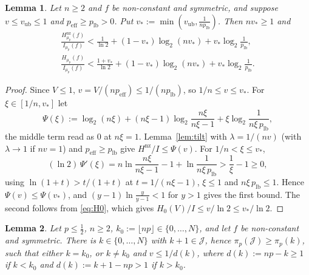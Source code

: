 \documentclass[11pt]{amsart}
\newtheorem{lemma}{Lemma}[section]
\theoremstyle{remark}
\newcommand{\peff}{p_{\mathrm{eff}}}
\newcommand{\J}{\mathcal{J}}
\begin{document}
\begin{lemma}\label{lem:opt}
Let $n \ge 2$ and $f$ be non-constant and symmetric, and suppose $v \le v_{\mathrm{ub}} \le 1$ and $\peff \ge p_{\mathrm{lb}} > 0$. Put $v_* := \min(v_{\mathrm{ub}}, \frac{1}{n p_{\mathrm{lb}}})$. Then $nv_* \ge 1$ and
\[
\begin{gathered}
\frac{H^{\mathrm{nz}}_{\mu_p}(f)}{I_{\mu_p}(f)} < \frac{1}{\ln 2} + (1 - v_*)\log_2(nv_*) + v_*\log_2\frac{1}{p_{\mathrm{lb}}},\\
\frac{H_{\mu_p}(f)}{I_{\mu_p}(f)} < \frac{1 + v_*}{\ln 2} + (1 - v_*)\log_2(nv_*) + v_*\log_2\frac{1}{p_{\mathrm{lb}}}.
\end{gathered}
\]
\end{lemma}

\begin{proof}
Since $V \le 1$, $v = V/(n\peff) \le 1/(n p_{\mathrm{lb}})$, so $1/n \le v \le v_*$. For $\xi \in [1/n, v_*]$ let
\[
\Psi(\xi) := \log_2(n\xi) + (n\xi - 1)\log_2\frac{n\xi}{n\xi - 1} + \xi\log_2\frac{1}{n\xi\,p_{\mathrm{lb}}},
\]
the middle term read as $0$ at $n\xi = 1$. Lemma~\ref{lem:tilt} with $\lambda = 1/(nv)$ (with $\lambda \to 1$ if $nv = 1$) and $\peff \ge p_{\mathrm{lb}}$ give $H^{\mathrm{nz}}/I \le \Psi(v)$. For $1/n < \xi \le v_*$,
\[
(\ln 2)\,\Psi'(\xi) = n\ln\frac{n\xi}{n\xi - 1} - 1 + \ln\frac{1}{n\xi\,p_{\mathrm{lb}}} > \frac1\xi - 1 \ge 0,
\]
using $\ln(1 + t) > t/(1+t)$ at $t = 1/(n\xi - 1)$, $\xi \le 1$ and $n\xi\,p_{\mathrm{lb}} \le 1$. Hence $\Psi(v) \le \Psi(v_*)$, and $(y - 1)\ln\frac{y}{y-1} < 1$ for $y > 1$ gives the first bound. The second follows from \eqref{eq:H0}, which gives $H_0(V)/I \le v/\ln 2 \le v_*/\ln 2$.
\end{proof}

\begin{lemma}\label{lem:dich}
Let $p \le \frac12$, $n \ge 2$, $k_0 := \lfloor np \rfloor \in \{0, \dots, N\}$, and let $f$ be non-constant and symmetric. There is $k \in \{0, \dots, N\}$ with $k + 1 \in \J$, hence $\pi_p(\J) \ge \pi_p(k)$, such that either $k = k_0$, or $k \ne k_0$ and $v \le 1/d(k)$, where $d(k) := np - k \ge 1$ if $k < k_0$ and $d(k) := k + 1 - np > 1$ if $k > k_0$.
\end{lemma}
\end{document}
